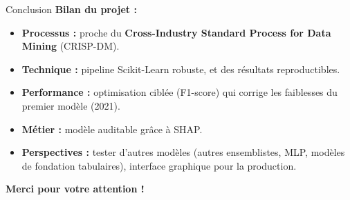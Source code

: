 \documentclass[aspectratio=169, 10pt]{beamer}
\begin{document}
\begin{frame}{Conclusion}
    \textbf{Bilan du projet :}
    \pause
    \begin{itemize}
    		\item \textbf{Processus :} proche du \textbf{Cross-Industry Standard Process for Data Mining} (CRISP-DM).
    		\pause
        \item \textbf{Technique :} pipeline Scikit-Learn robuste, et des résultats reproductibles.
        \pause
        \item \textbf{Performance :} optimisation ciblée (F1-score) qui corrige les faiblesses du premier modèle (2021).
        \pause
        \item \textbf{Métier :} modèle auditable grâce à SHAP.
    		\pause
        \item \textbf{Perspectives :} tester d'autres modèles (autres ensemblistes, MLP, modèles de fondation tabulaires), interface graphique pour la production.
    \end{itemize}

    \vspace{0.5cm}
    \begin{center}
        \Large{\textbf{Merci pour votre attention !}}
    \end{center}
\end{frame}
\end{document}
